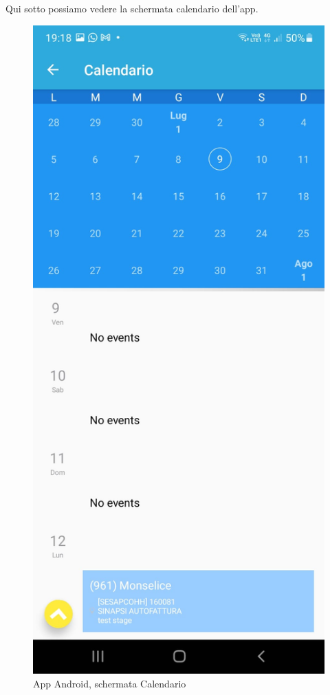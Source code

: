 Qui sotto possiamo vedere la schermata calendario dell'app.\\
\begin{figure}[!h] 
	\centering 
	\includegraphics[scale = 0.11]{immagini/app Android/calendario-android.jpeg}
	\caption {App Android, schermata Calendario}
\end{figure}
